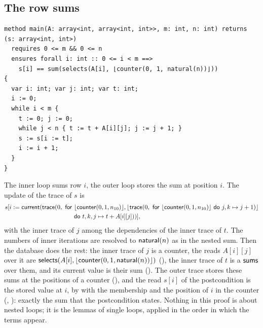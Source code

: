 \subsection{The row sums}
\begin{lstlisting}
method main(A: array<int, array<int, int>>, m: int, n: int) returns (s: array<int, int>)
  requires 0 <= m && 0 <= n
  ensures forall i: int :: 0 <= i < m ==>
    s[i] == sum(selects(A[i], ⌊counter(0, 1, natural(n))⌋))
{
  var i: int; var j: int; var t: int;
  i := 0;
  while i < m {
    t := 0; j := 0;
    while j < n { t := t + A[i][j]; j := j + 1; }
    s := s[i := t];
    i := i + 1;
  }
}
\end{lstlisting}
The inner loop sums row $i$, the outer loop stores the sum at position $i$. The update of the trace of $s$ is
\begin{align*}
  s[i := \mathsf{current}(\mathsf{trace}(0,\ \mathsf{for}\ &\lfloor \mathsf{counter}(0, 1, n_{10})\rfloor, \lfloor \mathsf{trace}(0,\ \mathsf{for}\ \lfloor \mathsf{counter}(0, 1, n_{10})\rfloor\ \mathsf{do}\ j, k \mapsto j + 1)\rfloor\\
  &\mathsf{do}\ t, k, j \mapsto t + A[i][j]))],
\end{align*}
with the inner trace of $j$ among the dependencies of the inner trace of $t$. The numbers of inner iterations
are resolved to $\mathsf{natural}(n)$ as in the nested sum. Then the database does the rest: the inner trace of $j$ is a
counter, the reads $A[i][j]$ over it are $\mathsf{selects}(A[i], \lfloor \mathsf{counter}(0, 1, \mathsf{natural}(n))\rfloor)$ (),
the inner trace of $t$ is a $\mathsf{sums}$ over them, and its current value is their sum (). The
outer trace stores these sums at the positions of a counter (), and the read $s[i]$ of the
postcondition is the stored value at $i$, by  with the membership and the position of
$i$ in the counter (, ): exactly the sum that the
postcondition states. Nothing in this proof is about nested loops; it is the lemmas of single loops, applied
in the order in which the terms appear.

